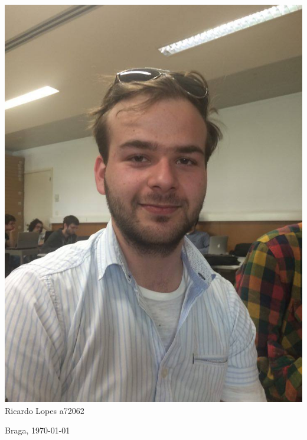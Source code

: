 \begin{titlepage}
\begin{center}
\hfill
\begin{minipage}[b]{.1\textwidth}	\includegraphics[scale=0.1]{ricardo}
		\small{Ricardo Lopes a72062}
\end{minipage}



\vspace{3ex}


\vfill

\large Braga, {\large \today}

\end{center}
\end{titlepage}
